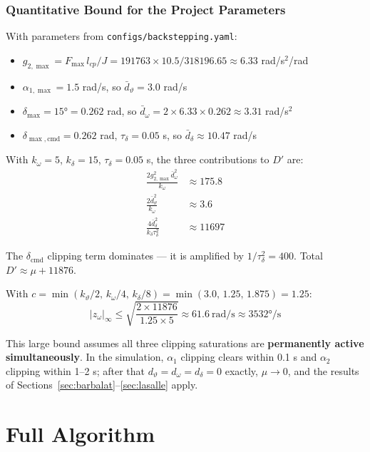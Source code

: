 \documentclass[11pt,a4paper]{article}
\theoremstyle{plain}
\theoremstyle{remark}
\newcommand{\vth}{\vartheta}
\newcommand{\zom}{z_{\omega}}
\newcommand{\dmax}{\delta_{\max}}
\newcommand{\dcmd}{\delta_{\mathrm{cmd}}}
\newcommand{\Fmax}{F_{\max}}
\begin{document}
\subsubsection{Quantitative Bound for the Project Parameters}

With parameters from \texttt{configs/backstepping.yaml}:
\begin{itemize}
  \item $g_{2,\max} = \Fmax\,l_{cp}/J = 191763 \times 10.5 / 318196.65 \approx 6.33$ rad/s$^2$/rad
  \item $\alpha_{1,\max} = 1.5$ rad/s, so $\bar{d}_\vartheta = 3.0$ rad/s
  \item $\dmax = 15° = 0.262$ rad, so $\bar{d}_\omega = 2 \times 6.33 \times 0.262 \approx 3.31$ rad/s$^2$
  \item $\delta_{\max,\mathrm{cmd}} = 0.262$ rad, $\tau_\delta = 0.05$ s, so $\bar{d}_\delta \approx 10.47$ rad/s
\end{itemize}

With $k_\omega = 5$, $k_\delta = 15$, $\tau_\delta = 0.05$ s, the three contributions to $D'$ are:
\begin{align}
  \frac{2g_{2,\max}^2\bar{d}_\omega^2}{k_\omega} &\approx 175.8 \\
  \frac{2\bar{d}_\vartheta^2}{k_\omega} &\approx 3.6 \\
  \frac{4\bar{d}_\delta^2}{k_\delta\tau_\delta^2} &\approx 11697
\end{align}

The $\dcmd$ clipping term dominates --- it is amplified by $1/\tau_\delta^2 = 400$. Total $D' \approx \mu + 11876$.

With $c = \min(k_\vth/2,\, k_\omega/4,\, k_\delta/8) = \min(3.0,\, 1.25,\, 1.875) = 1.25$:
\[
  |\zom|_\infty \leq \sqrt{\frac{2 \times 11876}{1.25 \times 5}} \approx 61.6\ \text{rad/s} \approx 3532°/\text{s}
\]

This large bound assumes all three clipping saturations are \textbf{permanently active simultaneously}. In the simulation, $\alpha_1$ clipping clears within 0.1 s and $\alpha_2$ clipping within 1--2 s; after that $d_\vartheta = d_\omega = d_\delta = 0$ exactly, $\mu \to 0$, and the results of Sections~\ref{sec:barbalat}--\ref{sec:lasalle} apply.

\section{Full Algorithm}
\end{document}
